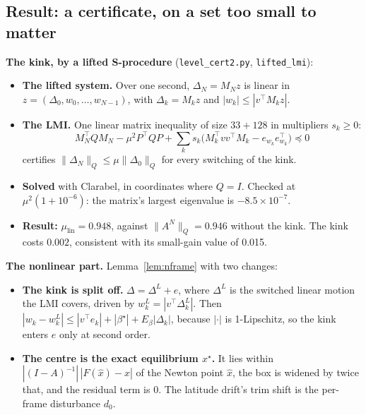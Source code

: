\documentclass[11pt]{article}
\begin{document}
\subsection{Result: a certificate, on a set too small to matter}\label{sec:levelwhy}

\textbf{The kink, by a lifted S-procedure} (\texttt{level\_cert2.py}, \texttt{lifted\_lmi}):
\begin{itemize}
\item \textbf{The lifted system.} Over one second, $\Delta_N = M_N z$ is linear in $z = (\Delta_0, w_0, \dots, w_{N-1})$, with $\Delta_k = M_k z$ and $|w_k| \le |v^\top M_k z|$.
\item \textbf{The LMI.} One linear matrix inequality of size $33 + 128$ in multipliers $s_k \ge 0$:
\[ M_N^\top Q M_N - \mu^2 P^\top Q P + \textstyle\sum_k s_k\bigl(M_k^\top v v^\top M_k - e_{w_k} e_{w_k}^\top\bigr) \preceq 0 \]
certifies $\|\Delta_N\|_Q \le \mu\|\Delta_0\|_Q$ for every switching of the kink.
\item \textbf{Solved} with Clarabel, in coordinates where $Q = I$. Checked at $\mu^2(1 + 10^{-6})$: the matrix's largest eigenvalue is $-8.5\times10^{-7}$.
\item \textbf{Result:} $\mu_{\mathrm{lin}} = 0.948$, against $\|A^N\|_Q = 0.946$ without the kink. The kink costs $0.002$, consistent with its small-gain value of 0.015.
\end{itemize}

\textbf{The nonlinear part.} Lemma~\ref{lem:nframe} with two changes:
\begin{itemize}
\item \textbf{The kink is split off.} $\Delta = \Delta^L + e$, where $\Delta^L$ is the switched linear motion the LMI covers, driven by $w^L_k = |v^\top\Delta^L_k|$. Then $|w_k - w^L_k| \le |v^\top e_k| + |\beta^\star| + E_\beta|\Delta_k|$, because $|\cdot|$ is 1-Lipschitz, so the kink enters $e$ only at second order.
\item \textbf{The centre is the exact equilibrium $x^\star$.} It lies within $|(I - A)^{-1}|\,|F(\hat x) - \hat x|$ of the Newton point $\hat x$, the box is widened by twice that, and the residual term is 0. The latitude drift's trim shift is the per-frame disturbance $d_0$.
\end{itemize}
\end{document}
